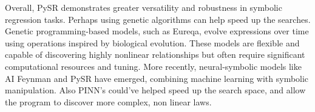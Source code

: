 \documentclass{article}
\begin{document}
Overall, PySR demonstrates greater versatility and robustness in symbolic regression tasks. Perhaps using genetic algorithms can help speed up the searches. \\
Genetic programming-based models, such as Eureqa, evolve expressions over time using operations inspired by biological evolution. These models are flexible and capable of discovering highly nonlinear relationships but often require significant computational resources and tuning. More recently, neural-symbolic models like AI Feynman and PySR have emerged, combining machine learning with symbolic manipulation. Also PINN's could've helped speed up the search space, and allow the program to discover more complex, non linear laws.\\ 
\end{document}
